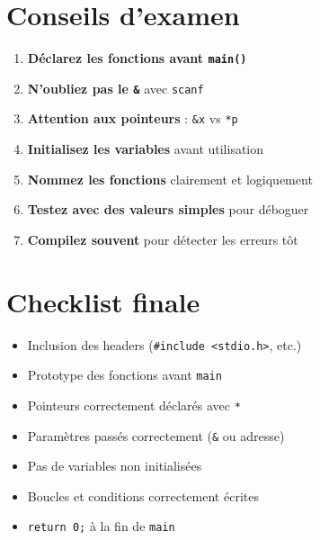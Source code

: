 \documentclass[12pt,a4paper]{article}
\begin{document}
\section{Conseils d'examen}

\begin{enumerate}
    \item \textbf{Déclarez les fonctions avant \texttt{main()}}
    \item \textbf{N'oubliez pas le \texttt{\&}} avec \texttt{scanf}
    \item \textbf{Attention aux pointeurs} : \texttt{\&x} vs \texttt{*p}
    \item \textbf{Initialisez les variables} avant utilisation
    \item \textbf{Nommez les fonctions} clairement et logiquement
    \item \textbf{Testez avec des valeurs simples} pour déboguer
    \item \textbf{Compilez souvent} pour détecter les erreurs tôt
\end{enumerate}

\section{Checklist finale}

\begin{itemize}
    \item[\checkmark] Inclusion des headers (\texttt{\#include <stdio.h>}, etc.)
    \item[\checkmark] Prototype des fonctions avant \texttt{main}
    \item[\checkmark] Pointeurs correctement déclarés avec \texttt{*}
    \item[\checkmark] Paramètres passés correctement (\texttt{\&} ou adresse)
    \item[\checkmark] Pas de variables non initialisées
    \item[\checkmark] Boucles et conditions correctement écrites
    \item[\checkmark] \texttt{return 0;} à la fin de \texttt{main}
\end{itemize}
\end{document}

